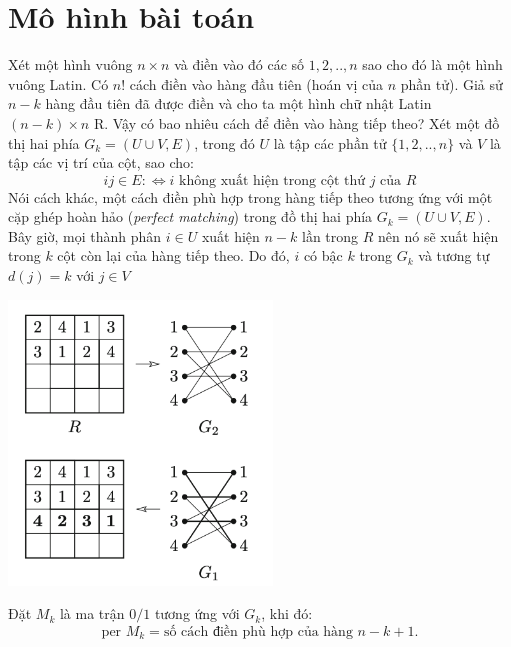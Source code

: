 \documentclass[a4paper, 12pt]{report}
\begin{document}
\section{Mô hình bài toán}
Xét một hình vuông $n \times n$ và điền vào đó các số $1,2,..,n$ sao cho đó là một hình vuông Latin. Có $n!$ cách điền vào hàng đầu tiên (hoán vị của $n$ phần tử). Giả sử $n-k$ hàng đầu tiên đã được điền và cho ta một hình chữ nhật Latin $(n-k) \times n$ R. Vậy có bao nhiêu cách để điền vào hàng tiếp theo? Xét một đồ thị hai phía $G_k = (U \cup V,E)$, trong đó $U$ là tập các phần tử $\{1,2,..,n\}$ và $V$ là tập các vị trí của cột, sao cho:
\begin{equation*}
ij \in E :\Leftrightarrow i \textrm{ không xuất hiện trong cột thứ } j \textrm{ của } R
\end{equation*}
Nói cách khác, một cách điền phù hợp trong hàng tiếp theo tương ứng với một cặp ghép hoàn hảo (\textit{perfect matching}) trong đồ thị hai phía $G_k = (U \cup V,E)$. Bây giờ, mọi thành phân $i \in U$ xuất hiện $n-k$ lần trong $R$ nên nó sẽ xuất hiện trong $k$ cột còn lại của hàng tiếp theo. Do đó, $i$ có bậc $k$ trong $G_k$ và tương tự $d(j) = k $ với $j \in V$ \\
\begin{center}
	\includegraphics[width=7cm]{ex3}
\end{center}
Đặt $M_k$ là ma trận $0/1$ tương ứng với $G_k$, khi đó:
\begin{equation*}
	\textrm{per } M_k = \textrm{số cách điền phù hợp của hàng } n-k+1.
\end{equation*}
\end{document}
